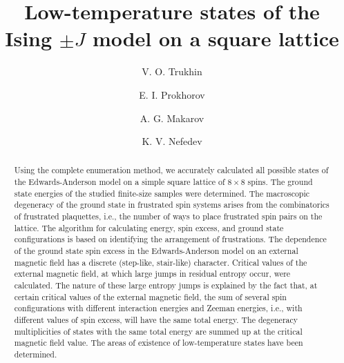 \documentclass[preprint,12pt]{elsarticle}
\begin{document}
	
	\begin{frontmatter}
		
		
		\title{Low-temperature states of the Ising $\pm J$ model on a square lattice}
		
		\author[FEFU,IPM]{V. O. Trukhin}
		\author[FEFU]{E. I. Prokhorov}
		\author[FEFU,IPM]{A. G. Makarov}
		\author[FEFU,IPM]{K. V. Nefedev}
		
		\begin{abstract}
			
			Using the complete enumeration method, we accurately calculated all possible states of the Edwards-Anderson model on a simple square lattice of $8 \times 8$ spins. The ground state energies of the studied finite-size samples were determined. The macroscopic degeneracy of the ground state in frustrated spin systems arises from the combinatorics of frustrated plaquettes, i.e., the number of ways to place frustrated spin pairs on the lattice. The algorithm for calculating energy, spin excess, and ground state configurations is based on identifying the arrangement of frustrations. The dependence of the ground state spin excess in the Edwards-Anderson model on an external magnetic field has a discrete (step-like, stair-like) character. Critical values of the external magnetic field, at which large jumps in residual entropy occur, were calculated. The nature of these large entropy jumps is explained by the fact that, at certain critical values of the external magnetic field, the sum of several spin configurations with different interaction energies and Zeeman energies, i.e., with different values of spin excess, will have the same total energy. The degeneracy multiplicities of states with the same total energy are summed up at the critical magnetic field value. The areas of existence of low-temperature states have been determined.
			

\end{abstract}
\end{frontmatter}
\end{document}
